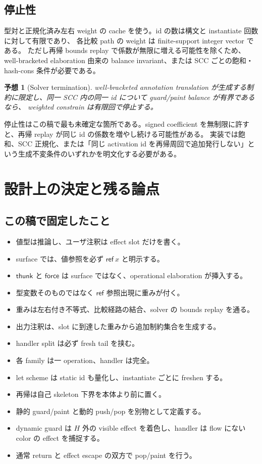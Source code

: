 \documentclass[uplatex,dvipdfmx,a4paper,11pt]{jsarticle}
\theoremstyle{jpplain}
\newtheorem{conjecture}[definition]{予想}
\newcommand{\thunk}{\mathsf{thunk}}
\newcommand{\force}{\mathsf{force}}
\begin{document}
\subsection{停止性}

型対と正規化済み左右 weight の cache を使う。id の数は構文と instantiate 回数に対して有限であり、
各比較 path の weight は finite-support integer vector である。
ただし再帰 bounds replay で係数が無限に増える可能性を除くため、
well-bracketed elaboration 由来の balance invariant、または SCC ごとの飽和・hash-cons 条件が必要である。

\begin{conjecture}[Solver termination]
well-bracketed annotation translation が生成する制約に限定し、同一 SCC 内の同一 id について guard/paint balance が有界であるなら、
weighted constrain は有限回で停止する。
\end{conjecture}

\begin{statusbox}
停止性はこの稿で最も未確定な箇所である。signed coefficient を無制限に許すと、再帰 replay が同じ id の係数を増やし続ける可能性がある。
実装では飽和、SCC 正規化、または「同じ activation id を再帰周回で追加発行しない」という生成不変条件のいずれかを明文化する必要がある。
\end{statusbox}

\section{設計上の決定と残る論点}

\subsection{この稿で固定したこと}
\begin{itemize}
  \item 値型は推論し、ユーザ注釈は effect slot だけを書く。
  \item surface では、値参照を必ず \(\mathsf{ref}\ x\) と明示する。
  \item \(\thunk\) と \(\force\) は surface ではなく、operational elaboration が挿入する。
  \item 型変数そのものではなく \(\mathsf{ref}\) 参照出現に重みが付く。
  \item 重みは左右付き不等式、比較経路の結合、solver の bounds replay を通る。
  \item 出力注釈は、slot に到達した重みから追加制約集合を生成する。
  \item handler split は必ず fresh tail を挟む。
  \item 各 family は一 operation、handler は完全。
  \item let scheme は static id も量化し、instantiate ごとに freshen する。
  \item 再帰は自己 skeleton 下界を本体より前に置く。
  \item 静的 guard/paint と動的 push/pop を別物として定義する。
  \item dynamic guard は $H$ 外の visible effect を着色し、handler は flow にない color の effect を捕捉する。
  \item 通常 return と effect escape の双方で pop/paint を行う。
\end{itemize}
\end{document}
